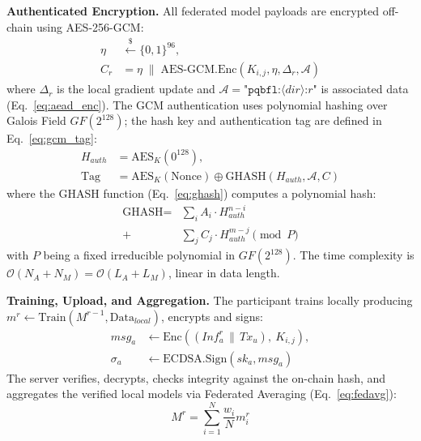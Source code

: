 \documentclass[journal, 10pt, twocolumn]{IEEEtran}
\begin{document}
\textbf{Authenticated Encryption.} All federated model payloads are encrypted off-chain using AES-256-GCM:
\begin{equation}
\begin{split}
\eta &\xleftarrow{\$} \{0,1\}^{96}, \\
C_r &= \eta \;\|\; \text{AES-GCM.Enc}(K_{i,j}, \eta, \Delta_r, \mathcal{A})
\end{split}
\label{eq:aead_enc}
\end{equation}
where $\Delta_r$ is the local gradient update and $\mathcal{A} = \texttt{"pqbfl:}\langle\textit{dir}\rangle\texttt{:}r\texttt{"}$ is associated data (Eq.~\eqref{eq:aead_enc}). The GCM authentication uses polynomial hashing over Galois Field $GF(2^{128})$; the hash key and authentication tag are defined in Eq.~\eqref{eq:gcm_tag}:
\begin{equation}
\begin{split}
H_{auth} &= \text{AES}_K(0^{128}), \\
\text{Tag} &= \text{AES}_K(\text{Nonce}) \oplus \text{GHASH}(H_{auth}, \mathcal{A}, C)
\end{split}
\label{eq:gcm_tag}
\end{equation}
where the GHASH function (Eq.~\eqref{eq:ghash}) computes a polynomial hash:
\begin{equation}
\begin{split}
\text{GHASH} = &\sum_{i} A_i \cdot H_{auth}^{n-i} \\
              +&\sum_{j} C_j \cdot H_{auth}^{m-j} \pmod{P}
\end{split}
\label{eq:ghash}
\end{equation}
with $P$ being a fixed irreducible polynomial in $GF(2^{128})$. The time complexity is $\mathcal{O}(N_A + N_M) = \mathcal{O}(L_A + L_M)$, linear in data length.

\textbf{Training, Upload, and Aggregation.} The participant trains locally producing $m^r \leftarrow \text{Train}(M^{r-1}, \text{Data}_{local})$, encrypts and signs:
\begin{equation}
\begin{split}
msg_a &\leftarrow \text{Enc}((Inf_a^r \,\|\, Tx_u),\ K_{i,j}), \\
\sigma_a &\leftarrow \text{ECDSA.Sign}(sk_a, msg_a)
\end{split}
\label{eq:participant_send}
\end{equation}
The server verifies, decrypts, checks integrity against the on-chain hash, and aggregates the verified local models via Federated Averaging (Eq.~\eqref{eq:fedavg}):
\begin{equation}
M^r = \sum_{i=1}^{N} \frac{w_i}{N} m_i^r
\label{eq:fedavg}
\end{equation}
\end{document}
